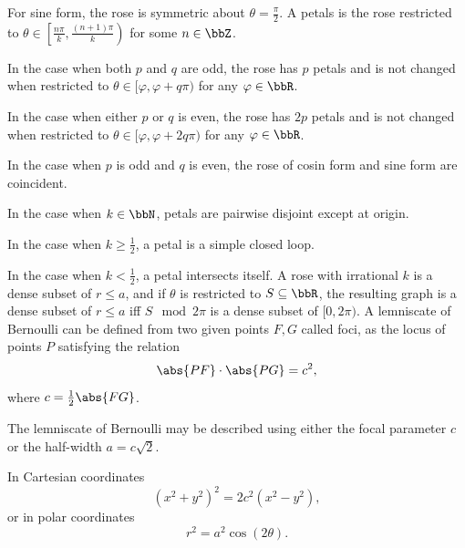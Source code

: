 \item For sine form, the rose is symmetric about $\theta=\frac{\pi}{2}$. A petals is the rose restricted to $\theta\in\left.\left[\frac{n\pi}{k},\frac{(n+1)\pi}{k}\right.\right)$ for some $n\in\bbZ$.
\item In the case when both $p$ and $q$ are odd, the rose has $p$ petals and is not changed when restricted to $\theta\in[\varphi,\varphi+q\pi)$ for any $\varphi\in\bbR$.
\item In the case when either $p$ or $q$ is even, the rose has $2p$ petals and is not changed when restricted to $\theta\in[\varphi,\varphi+2q\pi)$ for any $\varphi\in\bbR$.
\item In the case when $p$ is odd and $q$ is even, the rose of cosin form and sine form are coincident.
\item In the case when $k\in\bbN$, petals are pairwise disjoint except at origin.
\item In the case when $k\ge\frac{1}{2}$, a petal is a simple closed loop.
\item In the case when $k<\frac{1}{2}$, a petal intersects itself.
\eit
A rose with irrational $k$ is a dense subset of $r\le a$, and if $\theta$ is restricted to $S\subseteq\bbR$, the resulting graph is a dense subset of $r\le a$ iff $S\mod 2\pi$ is a dense subset of $[0,2\pi)$.
A lemniscate of Bernoulli can be defined from two given points $F,G$ called foci, as the locus of points $P$ satisfying the relation
\[\abs{PF}\cdot\abs{PG}=c^2,\]
where $c=\frac{1}{2}\abs{FG}$.

The lemniscate of Bernoulli may be described using either the focal parameter $c$ or the half-width ⁠$a=c\sqrt{2}$.

In Cartesian coordinates
\[(x^2+y^2)^2=2c^2(x^2-y^2),\]
or in polar coordinates
\[r^2=a^2\cos(2\theta).\]
